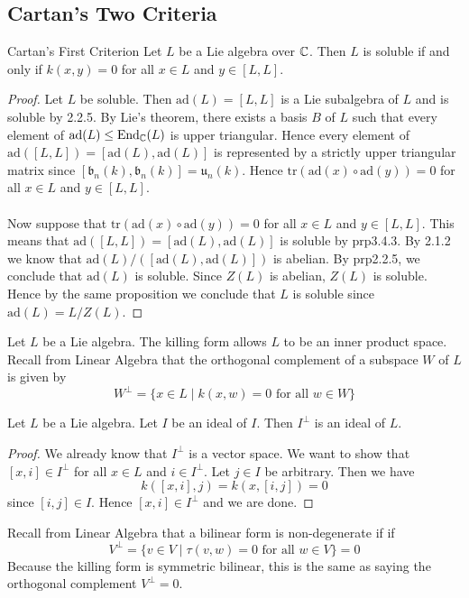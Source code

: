 \documentclass[a4paper]{article}
\begin{document}
\subsection{Cartan's Two Criteria}
\begin{thm}{Cartan's First Criterion}{} Let $L$ be a Lie algebra over $\mathbb{C}$. Then $L$ is soluble if and only if $k(x,y)=0$ for all $x\in L$ and $y\in[L,L]$. \tcbline
\begin{proof}
Let $L$ be soluble. Then $\text{ad}(L)=[L,L]$ is a Lie subalgebra of $L$ and is soluble by 2.2.5. By Lie's theorem, there exists a basis $B$ of $L$ such that every element of $\text{ad}(L)\leq\text{End}_{\mathbb{C}}(L)$ is upper triangular. Hence every element of $\text{ad}([L,L])=[\text{ad}(L),\text{ad}(L)]$ is represented by a strictly upper triangular matrix since $[\mathfrak{b}_n(k),\mathfrak{b}_n(k)]=\mathfrak{u}_n(k)$. Hence $\text{tr}(\text{ad}(x)\circ\text{ad}(y))=0$ for all $x\in L$ and $y\in[L,L]$. \\~\\

Now suppose that $\text{tr}(\text{ad}(x)\circ\text{ad}(y))=0$ for all $x\in L$ and $y\in[L,L]$. This means that $\text{ad}([L,L])=[\text{ad}(L),\text{ad}(L)]$ is soluble by prp3.4.3. By 2.1.2 we know that $\text{ad}(L)/([\text{ad}(L),\text{ad}(L)])$ is abelian. By prp2.2.5, we conclude that $\text{ad}(L)$ is soluble. Since $Z(L)$ is abelian, $Z(L)$ is soluble. Hence by the same proposition we conclude that $L$ is soluble since $\text{ad}(L)=L/Z(L)$. 
\end{proof}
\end{thm}

Let $L$ be a Lie algebra. The killing form allows $L$ to be an inner product space. Recall from Linear Algebra that the orthogonal complement of a subspace $W$ of $L$ is given by $$W^\perp=\{x\in L\;|\;k(x,w)=0\text{ for all }w\in W\}$$

\begin{lmm}{}{} Let $L$ be a Lie algebra. Let $I$ be an ideal of $I$. Then $I^\perp$ is an ideal of $L$. \tcbline
\begin{proof}
We already know that $I^\perp$ is a vector space. We want to show that $[x,i]\in I^\perp$ for all $x\in L$ and $i\in I^\perp$. Let $j\in I$ be arbitrary. Then we have $$k([x,i],j)=k(x,[i,j])=0$$ since $[i,j]\in I$. Hence $[x,i]\in I^\perp$ and we are done. 
\end{proof}
\end{lmm}

Recall from Linear Algebra that a bilinear form is non-degenerate if  if $$V^\perp=\{v\in V\;|\;\tau(v,w)=0\text{ for all }w\in V\}=0$$ Because the killing form is symmetric bilinear, this is the same as saying the orthogonal complement $V^\perp=0$. 
\end{document}
